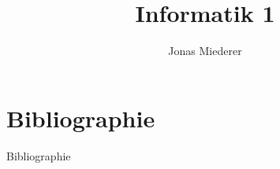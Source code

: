 \documentclass[xcolor=table, 9pt]{beamer}
\title{Informatik 1}
\author{Jonas Miederer}
\institute{DHBW Stuttgart - Campus Horb}
\begin{document}

%
%
%
%
%
%
%
%
%

%

 \section{Bibliographie}
        \begin{frame}[allowframebreaks]{Bibliographie}
            \printbibliography
\end{frame}
\end{document}
